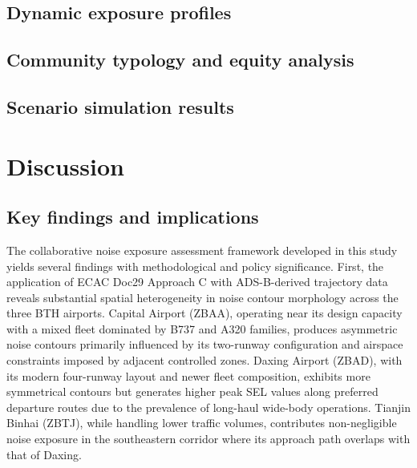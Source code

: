 \documentclass[review,12pt]{elsarticle}
\begin{document}

\subsection{Dynamic exposure profiles}


\subsection{Community typology and equity analysis}


\subsection{Scenario simulation results}


\section{Discussion}
\label{sec:discussion}

\subsection{Key findings and implications}

The collaborative noise exposure assessment framework developed in this study yields several findings with methodological and policy significance. First, the application of ECAC Doc29 Approach C with ADS-B-derived trajectory data reveals substantial spatial heterogeneity in noise contour morphology across the three BTH airports. Capital Airport (ZBAA), operating near its design capacity with a mixed fleet dominated by B737 and A320 families, produces asymmetric noise contours primarily influenced by its two-runway configuration and airspace constraints imposed by adjacent controlled zones. Daxing Airport (ZBAD), with its modern four-runway layout and newer fleet composition, exhibits more symmetrical contours but generates higher peak SEL values along preferred departure routes due to the prevalence of long-haul wide-body operations. Tianjin Binhai (ZBTJ), while handling lower traffic volumes, contributes non-negligible noise exposure in the southeastern corridor where its approach path overlaps with that of Daxing.
\end{document}
